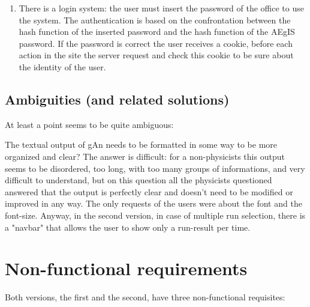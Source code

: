 \begin{enumerate}
\item There is a login system: the user must insert the password of the office to use the system. The authentication is based on the confrontation between the hash function of the inserted password and the hash function of the AEgIS password. If the password is correct the user receives a cookie, before each action in the site the server request and check this cookie to be sure about the identity of the user.  

\end{enumerate}

\subsection{Ambiguities (and related solutions)}

At least a point seems to be quite ambiguous: 


The textual output of gAn needs to be formatted in some way to be more organized and clear? 
The answer is difficult: for a non-physicists this output seems to be disordered, too long, with too many groups of informations, and very difficult to understand, but on this question all the physicists questioned answered that the output is perfectly clear and doesn't need to be modified or improved in any way. The only requests of the users were about the font and the font-size. Anyway, in the second version, in case of multiple run selection, there is a "navbar" that allows the user to show only a run-result per time.


\section{Non-functional requirements}

Both versions, the first and the second, have three non-functional requisites:

